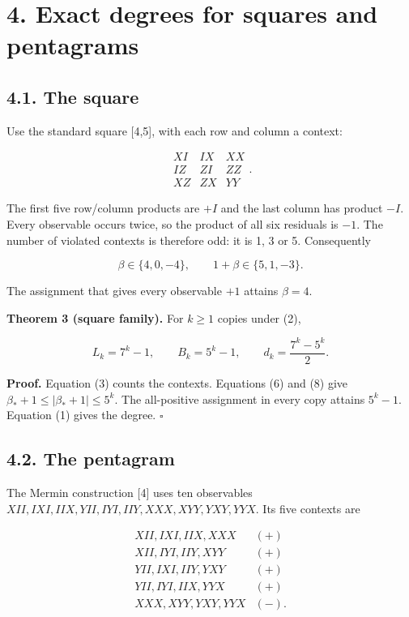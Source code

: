 \documentclass[10pt,a4paper]{article}
\begin{document}
\section{4. Exact degrees for squares and pentagrams}\label{exact-degrees-for-squares-and-pentagrams}

\subsection{4.1. The square}\label{the-square}

Use the standard square {[}4,5{]}, with each row and column a context:

\[\begin{array}{ccc}
XI&IX&XX\\
IZ&ZI&ZZ\\
XZ&ZX&YY
\end{array}.\]

The first five row/column products are \(+I\) and the last column has product \(-I\). Every observable occurs twice, so the product of all six residuals is \(-1\). The number of violated contexts is therefore odd: it is 1, 3 or 5. Consequently

\[\beta\in\{4,0,-4\},\qquad 1+\beta\in\{5,1,-3\}. \tag{8}\]

The assignment that gives every observable \(+1\) attains \(\beta=4\).

\textbf{Theorem 3 (square family).} For \(k\ge1\) copies under (2),

\[L_k=7^k-1,\qquad B_k=5^k-1,\qquad
d_k=\frac{7^k-5^k}{2}. \tag{9}\]

\textbf{Proof.} Equation (3) counts the contexts. Equations (6) and (8) give \(\beta_*+1\le|\beta_*+1|\le5^k\). The all-positive assignment in every copy attains \(5^k-1\). Equation (1) gives the degree. \(\square\)

\subsection{4.2. The pentagram}\label{the-pentagram}

The Mermin construction {[}4{]} uses ten observables \(XII,IXI,IIX,YII,IYI,IIY,XXX,XYY,YXY,YYX\). Its five contexts are

\[\begin{array}{ll}
XII,IXI,IIX,XXX &(+)\\
XII,IYI,IIY,XYY &(+)\\
YII,IXI,IIY,YXY &(+)\\
YII,IYI,IIX,YYX &(+)\\
XXX,XYY,YXY,YYX &(-).
\end{array}\]
\end{document}
